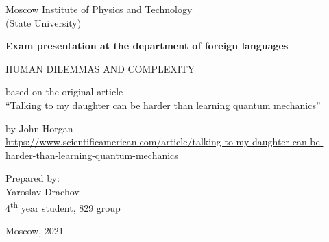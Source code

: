 \begin{titlepage}
   \begin{center}
	   Moscow Institute of Physics and Technology\\
	   (State University)
       \vspace*{3cm}

       \textbf{Exam presentation at the
       department of foreign languages}

       \vspace{0.5cm}

       HUMAN DILEMMAS AND COMPLEXITY
        
       \vspace{0.5cm}
        
        based on the original article\\
	``Talking to my daughter can be harder than learning quantum mechanics''
            
       \vspace{0.5cm}

       by John Horgan\\
       \url{https://www.scientificamerican.com/article/talking-to-my-daughter-can-be-harder-than-learning-quantum-mechanics}

       \vfill
            
     
       \begin{flushright}
       Prepared by:\\
       Yaroslav Drachov\\
       4\textsuperscript{th} year student, 829 group
       \end{flushright} 
       
       \vspace{3cm}
        
       Moscow, 2021
   \end{center}
\end{titlepage}
